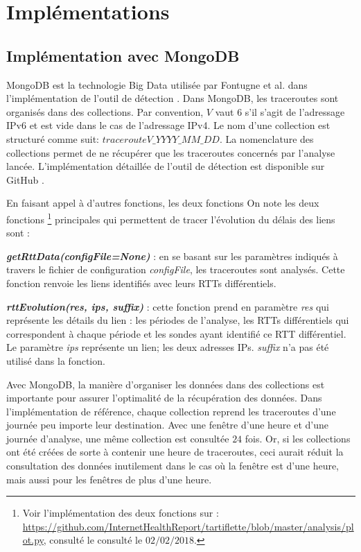 \chapter{Implémentations  } \label{chapter-implementations}


\section{Implémentation avec MongoDB}

MongoDB est la technologie Big Data utilisée par  Fontugne et al.  dans l'implémentation de l'outil de détection \cite{InternetHealthReport}. 
Dans MongoDB, les traceroutes sont organisés  dans des collections.  Par convention,  $V$  vaut $6$ s'il s'agit de l'adressage IPv6 et est vide dans le cas de l'adressage IPv4.  Le nom d'une collection est structuré comme suit: 	$tracerouteV\_YYYY\_MM\_DD$. La nomenclature  des collections permet de ne récupérer que les traceroutes concernés par l'analyse lancée.
L'implémentation détaillée de l'outil de détection est disponible sur GitHub \cite{InternetHealthReport}.  

En faisant appel à d'autres fonctions, les deux fonctions 
On note les deux fonctions \footnote{Voir l'implémentation des deux fonctions sur : \url{https://github.com/InternetHealthReport/tartiflette/blob/master/analysis/plot.py}, consulté le consulté le $ 02/02/2018$.} principales qui permettent de tracer l'évolution du délais des liens sont  :  

\textit{\textbf{getRttData(configFile=None)}} : en se basant sur les paramètres indiqués à travers le fichier de configuration \textit{configFile}, les traceroutes sont analysés. Cette fonction renvoie les liens identifiés avec leurs RTTs différentiels.

\textit{\textbf{rttEvolution(res, ips, suffix)}} : cette fonction prend en paramètre \textit{res} qui représente les détails du lien : les périodes de l'analyse, les RTTs différentiels qui correspondent à chaque période et les sondes ayant identifié ce RTT différentiel. Le paramètre \textit{ips} représente un lien; les deux adresses IPs.  \textit{suffix} n'a pas été utilisé dans la fonction.



Avec MongoDB,  la manière d'organiser les données dans des collections est importante pour assurer l'optimalité de la récupération des données. Dans l'implémentation de référence, chaque collection reprend les traceroutes d'une journée peu importe leur destination. Avec une fenêtre d'une heure et d'une journée d'analyse,  une même collection est consultée $24$ fois.   Or, si les collections ont été créées de sorte à contenir une heure de traceroutes, ceci aurait réduit la consultation des données inutilement dans le cas où la fenêtre est d'une heure, mais aussi pour les fenêtres de plus d'une heure. 

